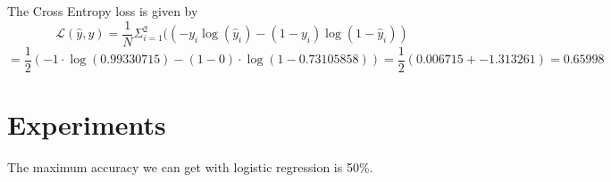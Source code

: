 \documentclass[addpoints]{exam}
\begin{document}
The Cross Entropy loss is given by 
\begin{equation}
	\mathscr{L}(\hat{y},y) = \frac{1}{N} \Sigma_{i=1}^{2}((-y_{i}\log(\hat{y}_{i}) - (1-{y}_{i})\log(1-\hat{y}_{i}))
\end{equation}
\begin{equation}
	= \frac{1}{2} (-1\cdot \log( 0.99330715) - (1-0)\cdot \log(1-	0.73105858)) = \frac{1}{2} (0.006715+-1.313261) = 0.65998
\end{equation}
    

  \section{Experiments}
  The maximum accuracy we can get with logistic regression is 50\%.

\end{document}
